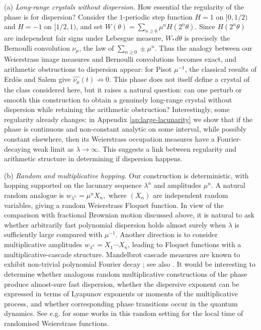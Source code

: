 \documentclass[11pt]{amsart}
\theoremstyle{plain}
\theoremstyle{definition}
\numberwithin{equation}{section}
\begin{document}
(a) \emph{Long-range crystals without dispersion.}
How essential the regularity of the phase is for dispersion? Consider the $1$-periodic step function $H=1$ on $[0,1/2)$ and $H=-1$ on $[1/2,1)$, and set
$
W(\theta)=\sum_{n\geq0}\mu^nH(2^n\theta).
$
Since $H(2^n\theta)$ are independent fair signs under Lebesgue measure, $W_*d\theta$ is precisely the Bernoulli convolution $\nu_\mu$, the law of $\sum_{n\geq0}\pm\mu^n$. Thus the analogy between our Weierstrass image measures and Bernoulli convolutions becomes exact, and arithmetic obstructions to dispersion appear: for Pisot $\mu^{-1}$, the classical results of Erd\"os and Salem give $\widehat{\nu_\mu}(t)\not\to0$. This phase does not itself define a crystal of the class considered here, but it raises a natural question: can one perturb or smooth this construction to obtain a genuinely long-range crystal without dispersion while retaining the arithmetic obstruction? Interestingly, some regularity already changes: in Appendix \ref{ap:large-lacunarity} we show that if the phase is continuous and non-constant analytic on some interval, while possibly constant elsewhere, then its Weierstrass occupation measures have a Fourier-decaying weak limit as $\lambda\to\infty$. This suggests a link between regularity and arithmetic structure in determining if dispersion happens.

(b) \emph{Random and multiplicative hopping.}
Our construction is deterministic, with hopping supported on the lacunary sequence $\lambda^n$ and amplitudes $\mu^n$. A natural random analogue is $w_{\lambda^n}=\mu^nX_n,$
where $(X_n)$ are independent random variables, giving a random Weierstrass Floquet function. In view of the comparison with fractional Brownian motion discussed above, it is natural to ask whether arbitrarily fast polynomial dispersion holds almost surely when $\lambda$ is sufficiently large compared with $\mu^{-1}$. Another direction is to consider multiplicative amplitudes $w_{\lambda^n}=X_1\cdots X_n$, leading to Floquet functions with a multiplicative-cascade structure. Mandelbrot cascade measures are known to exhibit non-trivial polynomial Fourier decay \cite{ChenLiSuomala}; see also \cite{GarbanVargas}. It would be interesting to determine whether analogous random multiplicative constructions of the phase produce almost-sure fast dispersion, whether the dispersive exponent can be expressed in terms of Lyapunov exponents or moments of the multiplicative process, and whether corresponding phase transitions occur in the quantum dynamics. See e.g. \cite{Romanowska} for some works in this random setting for the local time of randomised Weierstrass functions.
\end{document}
